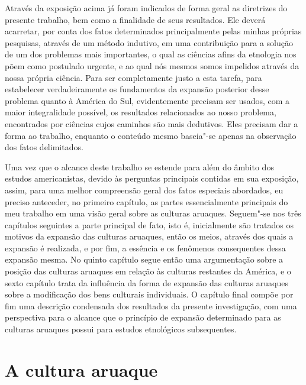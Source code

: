 Através da exposição acima já foram indicados de forma geral as
diretrizes do presente trabalho, bem como a finalidade de seus
resultados. Ele deverá acarretar, por conta dos fatos determinados
principalmente pelas minhas próprias pesquisas, através de um método
indutivo, em uma contribuição para a solução de um dos problemas mais
importantes, o qual as ciências afins da etnologia nos põem como
postulado urgente, e ao qual nós mesmos somos impelidos através da nossa
própria ciência. Para ser completamente justo a esta tarefa, para
estabelecer verdadeiramente os fundamentos da expansão posterior desse
problema quanto à América do Sul, evidentemente precisam ser usados,
com a maior integralidade possível, os resultados relacionados ao nosso
problema, encontrados por ciências cujos caminhos são mais dedutivos.
Eles precisam dar a forma ao trabalho, enquanto o conteúdo mesmo
baseia"-se apenas na observação dos fatos delimitados.

{Uma vez que o alcance deste trabalho se estende para além do âmbito dos
estudos americanistas, devido às perguntas principais contidas em sua
exposição, assim, para uma melhor compreensão geral dos fatos especiais
abordados, eu preciso anteceder, no primeiro capítulo, as partes
essencialmente principais do meu trabalho em uma visão geral sobre as
culturas aruaques. Seguem"-se nos três capítulos seguintes a parte
principal de fato, isto é, inicialmente são tratados os motivos da
expansão das culturas aruaques, então os meios, através dos quais a
expansão é realizada, e por fim, a essência e os fenômenos consequentes
dessa expansão mesma. No quinto capítulo segue então uma argumentação
sobre a posição das culturas aruaques em relação às culturas restantes da
América, e o sexto capítulo trata da influência da forma de expansão das
culturas aruaques sobre a modificação dos bens culturais individuais. O
capítulo final compõe por fim uma descrição condensada dos resultados da
presente investigação, com uma perspectiva para o alcance que o
princípio de expansão determinado para as culturas aruaques possui para
estudos etnológicos subsequentes.}


\chapter*{A cultura aruaque\smallskip{}}

